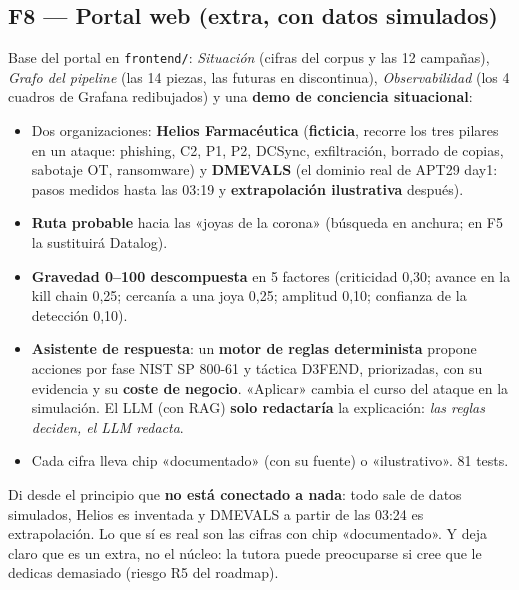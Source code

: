 \documentclass[11pt,a4paper]{article}
\newcommand{\cod}[1]{\texttt{#1}}
\begin{document}
\subsection{F8 — Portal web (extra, con datos simulados)}

Base del portal en \cod{frontend/}: \textit{Situación} (cifras del corpus y las 12 campañas), \textit{Grafo del
pipeline} (las 14 piezas, las futuras en discontinua), \textit{Observabilidad} (los 4 cuadros de Grafana
redibujados) y una \textbf{demo de conciencia situacional}:
\begin{itemize}
  \item Dos organizaciones: \textbf{Helios Farmacéutica} (\textbf{ficticia}, recorre los tres pilares en un ataque:
        phishing, C2, P1, P2, DCSync, exfiltración, borrado de copias, sabotaje OT, ransomware) y \textbf{DMEVALS}
        (el dominio real de APT29 day1: pasos medidos hasta las 03:19 y \textbf{extrapolación ilustrativa} después).
  \item \textbf{Ruta probable} hacia las «joyas de la corona» (búsqueda en anchura; en F5 la sustituirá Datalog).
  \item \textbf{Gravedad 0–100 descompuesta} en 5 factores (criticidad 0,30; avance en la kill chain 0,25;
        cercanía a una joya 0,25; amplitud 0,10; confianza de la detección 0,10).
  \item \textbf{Asistente de respuesta}: un \textbf{motor de reglas determinista} propone acciones por fase NIST SP 800-61
        y táctica D3FEND, priorizadas, con su evidencia y su \textbf{coste de negocio}. «Aplicar» cambia el curso del
        ataque en la simulación. El LLM (con RAG) \textbf{solo redactaría} la explicación: \textit{las reglas deciden,
        el LLM redacta}.
  \item Cada cifra lleva chip «documentado» (con su fuente) o «ilustrativo». 81 tests.
\end{itemize}

\begin{ojo}
Di desde el principio que \textbf{no está conectado a nada}: todo sale de datos simulados, Helios es inventada y
DMEVALS a partir de las 03:24 es extrapolación. Lo que sí es real son las cifras con chip «documentado». Y deja
claro que es un extra, no el núcleo: la tutora puede preocuparse si cree que le dedicas demasiado (riesgo R5
del roadmap).
\end{ojo}

\newpage
\end{document}

